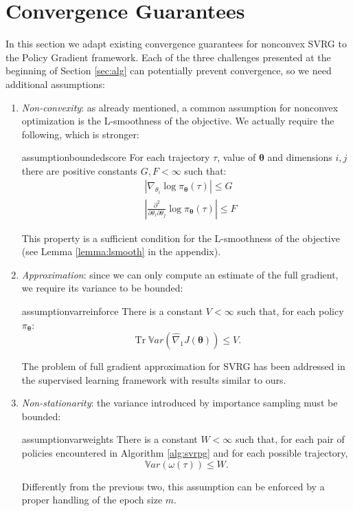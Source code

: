 \documentclass{article}
\theoremstyle{remark}
\theoremstyle{definition}
\DeclareMathOperator{\Tr}{Tr}
\newcommand{\vtheta}{\boldsymbol{\theta}}
\newcommand{\pol}{\pi_{\vtheta}}
\newcommand{\gradApp}[2]{\widehat{\nabla}_{#2}J(#1)}
\newcommand{\VARRF}{V}
\newcommand{\GRADLOG}{G}
\newcommand{\VARIS}{W}
\newcommand{\HESSLOG}{F}
\begin{document}
\section{Convergence Guarantees}\label{sec:conv}
In this section we adapt existing convergence guarantees for nonconvex SVRG \cite{reddi2016stochastic} \cite{allen2016variance} to the Policy Gradient framework.
Each of the three challenges presented at the beginning of Section \ref{sec:alg} can potentially prevent convergence, so we need additional assumptions:
\begin{enumerate}
\item \textit{Non-convexity}:
	as already mentioned, a common assumption for nonconvex optimization is the L-smoothness of the objective. We actually require the following, which is stronger:
	\begin{restatable}{assumption}{boundedscore}\label{ass:bounded_score}
		For each trajectory $\tau$, value of $\vtheta$ and dimensions $i,j$ there are positive constants $G,F<\infty$ such that:
		\begin{align*}
		&\left|\nabla_{\theta_i}\log\pi_{\vtheta}(\tau)\right| \leq \GRADLOG \\
		&\left|\frac{\partial^2}{\partial\theta_i\partial\theta_j}\log\pi_{\vtheta}(\tau)\right| \leq \HESSLOG
		\end{align*}
	\end{restatable}
	This property is a sufficient condition for the L-smoothness of the objective (see Lemma \ref{lemma:lsmooth} in the appendix).
\item \textit{Approximation}:
since we can only compute an estimate of the full gradient, we require its variance to be bounded:
	\begin{restatable}{assumption}{varreinforce}\label{ass:REINFORCE}
		There is a constant $V<\infty$ such that, for each policy $\pol$:
		\[
		\Tr\mathbb{V}ar\left(\gradApp{\vtheta}{1}\right) \leq \VARRF.
		\]
	\end{restatable}
The problem of full gradient approximation for SVRG has been addressed in the supervised learning framework \cite{harikandeh2015stopwasting} with results similar to ours.
\item \textit{Non-stationarity}:
the variance introduced by importance sampling must be bounded:
	\begin{restatable}{assumption}{varweights}\label{ass:M2}
		There is a constant $W<\infty$ such that, for each pair of policies encountered in Algorithm \ref{alg:svrpg} and for each possible trajectory,
		\[
		\mathbb{V}ar\left(\omega(\tau)\right) \leq \VARIS.
		\]
	\end{restatable}
Differently from the previous two, this assumption can be enforced by a proper handling of the epoch size $m$.
\end{enumerate}
\end{document}
